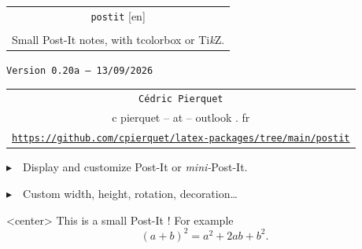 \documentclass[english,a4paper,11pt]{article}
\def\TPversion{0.20a}
\def\TPdate{13/09/2026}
\begin{document}
\setlength{\aweboxleftmargin}{0.07\linewidth}
\setlength{\aweboxcontentwidth}{0.93\linewidth}
\setlength{\aweboxvskip}{8pt}

\pagestyle{fancy}

\thispagestyle{empty}

\vspace{2cm}

\begin{center}
	\begin{minipage}{0.75\linewidth}
	\begin{tcolorbox}[colframe=yellow,colback=yellow!15]
		\begin{center}
			\begin{tabular}{c}
				{\Huge \texttt{postit} [en]}\\
				\\
				{\LARGE Small Post-It notes, with \textsf{tcolorbox} or \textsf{Ti\textit{k}Z}.} \\
			\end{tabular}

			\bigskip

			{\small \texttt{Version \TPversion{} -- \TPdate}}
		\end{center}
	\end{tcolorbox}
\end{minipage}
\end{center}

\begin{center}
	\begin{tabular}{c}
	\texttt{Cédric Pierquet}\\
	{\ttfamily c pierquet -- at -- outlook . fr}\\
	\texttt{\url{https://github.com/cpierquet/latex-packages/tree/main/postit}}
\end{tabular}
\end{center}

\vspace{0.25cm}

{$\blacktriangleright$~~Display and customize Post-It or \textit{mini-}Post-It.}

\vspace{0.25cm}

{$\blacktriangleright$~~Custom width, height, rotation, decoration\ldots}

\vspace{1cm}

\begin{PostItNote}[StorePostIt=PI1]<center>
	This is a small Post-It ! For example \[(a+b)^2=a^2+2ab+b^2.\]
\end{PostItNote}
\end{document}
